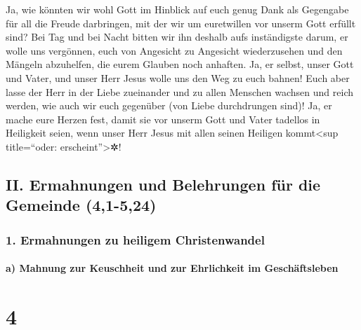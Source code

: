  Ja, wie könnten wir wohl Gott im Hinblick auf euch genug
Dank als Gegengabe für all die Freude darbringen, mit der wir um
euretwillen vor unserm Gott erfüllt sind?  Bei Tag und
bei Nacht bitten wir ihn deshalb aufs inständigste darum, er wolle uns
vergönnen, euch von Angesicht zu Angesicht wiederzusehen und den Mängeln
abzuhelfen, die eurem Glauben noch anhaften.  Ja, er
selbst, unser Gott und Vater, und unser Herr Jesus wolle uns den Weg zu
euch bahnen!  Euch aber lasse der Herr in der Liebe
zueinander und zu allen Menschen wachsen und reich werden, wie auch wir
euch gegenüber (von Liebe durchdrungen sind)!  Ja, er
mache eure Herzen fest, damit sie vor unserm Gott und Vater tadellos in
Heiligkeit seien, wenn unser Herr Jesus mit allen seinen Heiligen
kommt\textless sup title=``oder: erscheint''\textgreater✲!

\hypertarget{ii.-ermahnungen-und-belehrungen-fuxfcr-die-gemeinde-41-524}{%
\subsection{II. Ermahnungen und Belehrungen für die Gemeinde
(4,1-5,24)}\label{ii.-ermahnungen-und-belehrungen-fuxfcr-die-gemeinde-41-524}}

\hypertarget{ermahnungen-zu-heiligem-christenwandel}{%
\subsubsection{1. Ermahnungen zu heiligem
Christenwandel}\label{ermahnungen-zu-heiligem-christenwandel}}

\hypertarget{a-mahnung-zur-keuschheit-und-zur-ehrlichkeit-im-geschuxe4ftsleben}{%
\paragraph{a) Mahnung zur Keuschheit und zur Ehrlichkeit im
Geschäftsleben}\label{a-mahnung-zur-keuschheit-und-zur-ehrlichkeit-im-geschuxe4ftsleben}}

\hypertarget{section-3}{%
\section{4}\label{section-3}}

